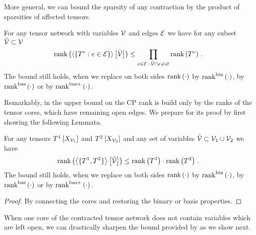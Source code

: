 More general, we can bound the sparsity of any contraction by the product of sparsities of affected tensors.

\begin{theorem}\label{the:CPrankContractionBound}
	For any tensor network with variables $\mathcal{V}$ and edges $\mathcal{E}$ we have for any subset $\tilde{\mathcal{V}}\subset\mathcal{V}$
		\[ \mathrm{rank}\left(\left\langle \{T^{e} : e\in\mathcal{E} \}\right\rangle \left[ \tilde{\mathcal{V}} \right]\right) \leq 
		\prod_{e\in\mathcal{E} \, : \, \tilde{\mathcal{V}}\cap e \neq \varnothing} \mathrm{rank}\left(T^{e}\right) \, . \]
	The bound still holds, when we replace on both sides $\mathrm{rank}\left(\cdot\right)$ by $\mathrm{rank}^{\mathrm{bin}}\left(\cdot\right)$, by $\mathrm{rank}^{\mathrm{bas}}\left(\cdot\right)$ or by $\mathrm{rank}^{\mathrm{bas+}}\left(\cdot\right)$.
\end{theorem}


Remarkably, in  the upper bound on the CP rank is build only by the ranks of the tensor cores, which have remaining open edges.
We prepare for its proof by first showing the following Lemmata.

\begin{lemma}\label{lem:sparsityGeneralContraction}
	For any tensors $T^{1}\left[X_{\mathcal{V}_1}\right]$ and $T^{2}\left[X_{\mathcal{V}_2}\right]$ and any set of variables $\tilde{\mathcal{V}}\subset\mathcal{V}_1\cup\mathcal{V}_2$ we have
		\[ \mathrm{rank}\left(\left\langle \{T^{1},T^{2}\}\right\rangle \left[ \tilde{\mathcal{V}} \right]\right) \leq \mathrm{rank}\left(T^{1}\right) \cdot \mathrm{rank}\left(T^{2}\right) \, . \]
	The bound still holds, when we replace on both sides $\mathrm{rank}\left(\cdot\right)$ by $\mathrm{rank}^{\mathrm{bin}}\left(\cdot\right)$, by $\mathrm{rank}^{\mathrm{bas}}\left(\cdot\right)$ or by $\mathrm{rank}^{\mathrm{bas+}}\left(\cdot\right)$.
\end{lemma}
\begin{proof}
	By connecting the cores and restoring the binary or basis properties.
\end{proof}

When one core of the contracted tensor network does not contain variables which are left open, we can drastically sharpen the bound provided by  as we show next.

